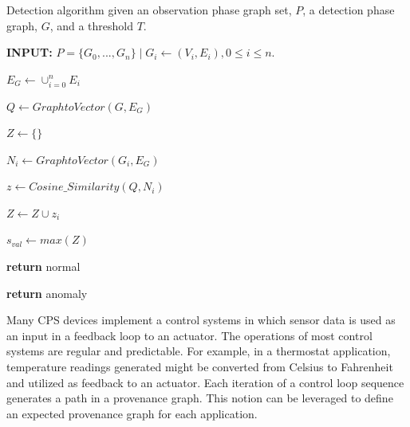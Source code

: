 \begin{algorithm}[h!]

\caption{Detection algorithm given an observation phase graph set, $P$, a detection phase graph, $G$, and a threshold $T$.} 
 \label{alg:graph_anomaly} 

\begin{algorithmic}[1]  


\State \textbf{INPUT: } $P=\{G_0,...,G_n\} \mid G_i\gets (V_i, E_i), 0 \leq i \leq n.$

\State $E_G \gets \cup_{i=0}^{n} E_i$

\State $Q \gets GraphtoVector(G, E_G)$ 

\State $Z \gets \{\}$

\State $N_i \gets GraphtoVector(G_i, E_G)$

\State $z \gets Cosine\_Similarity(Q, N_i)$

\State $Z \gets Z \cup z_i$

\EndFor	

\State $s_{val} \gets max(Z)$

\State \textbf{return} normal

\EndIf

\State \textbf{return} anomaly
\EndProcedure
\end{algorithmic}
\end{algorithm}

\par Many CPS devices implement a control systems in which sensor data is used as an input in a feedback loop to an actuator. The operations of most control systems are regular and predictable. For example, in a thermostat application, temperature readings generated might be converted from Celsius to Fahrenheit and utilized as feedback to an actuator. Each iteration of a control loop sequence generates a path in a provenance graph. This notion can be leveraged to define an expected provenance graph for each application. 

